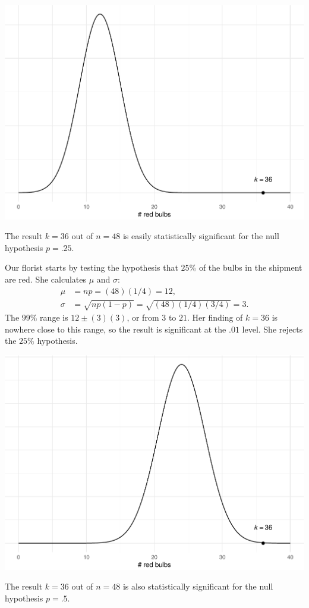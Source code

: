 \documentclass[justified]{tufte-book}
\theoremstyle{definition}
\theoremstyle{definition}
\theoremstyle{definition}
\theoremstyle{definition}
\theoremstyle{remark}
\begin{document}
\begin{marginfigure}
\includegraphics{_main_files/figure-latex/unnamed-chunk-155-1} \caption[The result $k = 36$ out of $n = 48$ is easily statistically significant for the null hypothesis $p = .25$]{The result $k = 36$ out of $n = 48$ is easily statistically significant for the null hypothesis $p = .25$.}\label{fig:unnamed-chunk-155}
\end{marginfigure}

Our florist starts by testing the hypothesis that \(25\%\) of the bulbs in the shipment are red. She calculates \(\mu\) and \(\sigma\):
\[
  \begin{aligned}
    \mu &= np = (48)(1/4) = 12,\\
    \sigma &= \sqrt{np(1-p)} = \sqrt{(48)(1/4)(3/4)} = 3.
  \end{aligned}
\]
The \(99\%\) range is \(12 \pm (3)(3)\), or from \(3\) to \(21\). Her finding of \(k = 36\) is nowhere close to this range, so the result is significant at the \(.01\) level. She rejects the \(25\%\) hypothesis.

\begin{marginfigure}
\includegraphics{_main_files/figure-latex/unnamed-chunk-156-1} \caption[The result $k = 36$ out of $n = 48$ is also statistically significant for the null hypothesis $p = .5$]{The result $k = 36$ out of $n = 48$ is also statistically significant for the null hypothesis $p = .5$.}\label{fig:unnamed-chunk-156}
\end{marginfigure}
\end{document}
